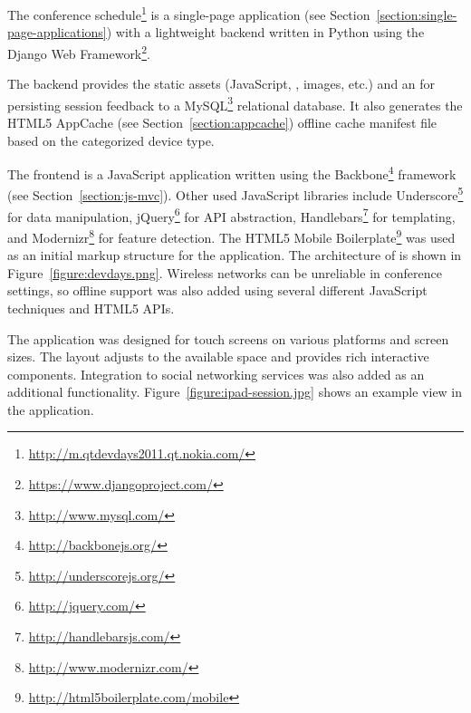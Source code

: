 The conference
schedule\footnote{\url{http://m.qtdevdays2011.qt.nokia.com/}} is a
single-page application (see
Section~\ref{section:single-page-applications}) with a lightweight
backend written in Python using the Django Web
Framework\footnote{\url{https://www.djangoproject.com/}}.

The backend provides the static assets (JavaScript, ,
images, etc.) and an  for persisting session feedback to a
MySQL\footnote{\url{http://www.mysql.com/}} relational database. It
also generates the HTML5 AppCache (see Section~\ref{section:appcache})
offline cache manifest file based on the categorized device type.

The frontend is a JavaScript application written using the
Backbone\footnote{\url{http://backbonejs.org/}}  framework
(see Section~\ref{section:js-mvc}). Other used JavaScript libraries
include Underscore\footnote{\url{http://underscorejs.org/}} for data
manipulation, jQuery\footnote{\url{http://jquery.com/}} for 
API abstraction, Handlebars\footnote{\url{http://handlebarsjs.com/}}
for templating, and
Modernizr\footnote{\url{http://www.modernizr.com/}} for feature
detection. The HTML5 Mobile
Boilerplate\footnote{\url{http://html5boilerplate.com/mobile}} was
used as an initial markup structure for the application. The
architecture of is shown in Figure~\ref{figure:devdays.png}. Wireless
networks can be unreliable in conference settings, so offline support
was also added using several different JavaScript techniques and HTML5
APIs.

The application was designed for touch screens on various platforms
and screen sizes. The layout adjusts to the available space and
provides rich interactive components. Integration to social networking
services was also added as an additional
functionality. Figure~\ref{figure:ipad-session.jpg} shows an example
view in the application.

